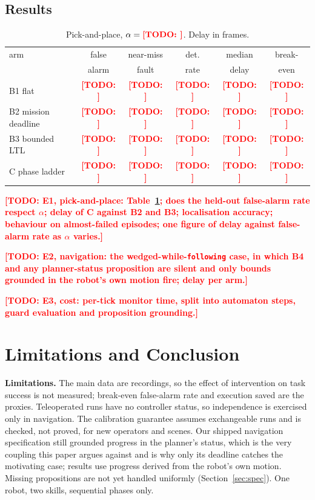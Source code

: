 \documentclass[letterpaper, 10pt, journal, twoside]{IEEEtran}
\newcommand{\TODO}[1]{\textcolor{red}{\textbf{[TODO: #1]}}}
\begin{document}
\subsection{Results}

\begin{table}[t]
\centering
\caption{Pick-and-place, $\alpha = \TODO{}$. Delay in frames.}
\label{tab:main}
\small
\begin{tabular}{@{}lccccc@{}}
\toprule
arm & false & near-miss & det. & median & break- \\
    & alarm & fault     & rate & delay  & even \\
\midrule
B1 flat             & \TODO{} & \TODO{} & \TODO{} & \TODO{} & \TODO{} \\
B2 mission deadline & \TODO{} & \TODO{} & \TODO{} & \TODO{} & \TODO{} \\
B3 bounded LTL      & \TODO{} & \TODO{} & \TODO{} & \TODO{} & \TODO{} \\
C phase ladder      & \TODO{} & \TODO{} & \TODO{} & \TODO{} & \TODO{} \\
\bottomrule
\end{tabular}
\end{table}

\TODO{E1, pick-and-place: Table~\ref{tab:main}; does the held-out
false-alarm rate respect $\alpha$; delay of C against B2 and B3;
localisation accuracy; behaviour on almost-failed episodes; one figure
of delay against false-alarm rate as $\alpha$ varies.}

\TODO{E2, navigation: the wedged-while-\texttt{following} case, in which
B4 and any planner-status proposition are silent and only bounds
grounded in the robot's own motion fire; delay per arm.}

\TODO{E3, cost: per-tick monitor time, split into automaton steps, guard
evaluation and proposition grounding.}

\section{Limitations and Conclusion}
\label{sec:conc}

\textbf{Limitations.} The main data are recordings, so the effect of
intervention on task success is not measured; break-even false-alarm
rate and execution saved are the proxies. Teleoperated runs have no
controller status, so independence is exercised only in navigation. The
calibration guarantee assumes exchangeable runs and is checked, not
proved, for new operators and scenes. Our shipped navigation
specification still grounded progress in the planner's status, which is
the very coupling this paper argues against and is why only its deadline
catches the motivating case; results use progress derived from the
robot's own motion. Missing propositions are not yet handled uniformly
(Section~\ref{sec:spec}). One robot, two skills, sequential phases only.
\end{document}
